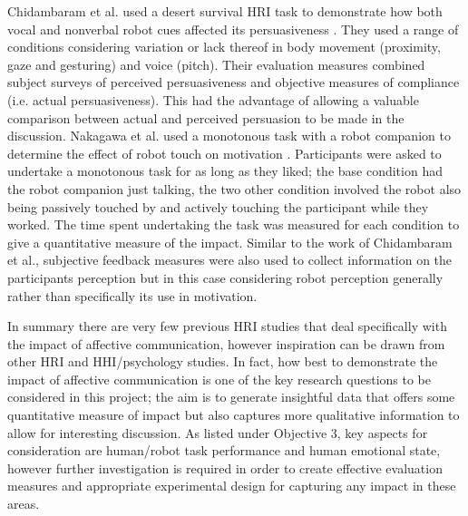 \documentclass[11pt]{article}
\begin{document}
Chidambaram et al. used a desert survival HRI task to demonstrate how both vocal and nonverbal robot cues affected its persuasiveness \cite{chidambaram2012designing}. They used a range of conditions considering variation or lack thereof in body movement (proximity, gaze and gesturing) and voice (pitch). Their evaluation measures combined subject surveys of perceived persuasiveness and objective measures of compliance (i.e. actual persuasiveness). This had the advantage of allowing a valuable comparison between actual and perceived persuasion to be made in the discussion. Nakagawa et al. used a monotonous task with a robot companion to determine the effect of robot touch on motivation \cite{nakagawa2011effect}. Participants were asked to undertake a monotonous task for as long as they liked; the base condition had the robot companion just talking, the two other condition involved the robot also being passively touched by and actively touching the participant while they worked. The time spent undertaking the task was measured for each condition to give a quantitative measure of the impact. Similar to the work of Chidambaram et al., subjective feedback measures were also used to collect information on the participants perception but in this case considering robot perception generally rather than specifically its use in motivation. 

In summary there are very few previous HRI studies that deal specifically with the impact of affective communication, however inspiration can be drawn from other HRI and HHI/psychology studies. In fact, how best to demonstrate the impact of affective communication is one of the key research questions to be considered in this project; the aim is to generate insightful data that offers some quantitative measure of impact but also captures more qualitative information to allow for interesting discussion. As listed under Objective 3, key aspects for consideration are human/robot task performance and human emotional state, however further investigation is required in order to create effective evaluation measures and appropriate experimental design for capturing any impact in these areas.
\end{document}
